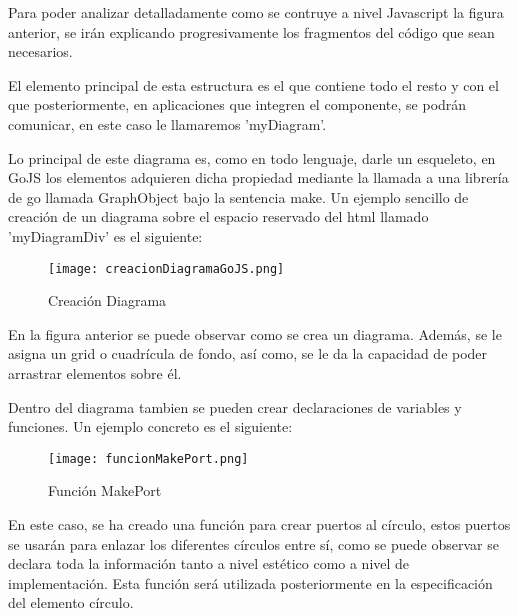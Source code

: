 \vspace{5mm}

Para poder analizar detalladamente como se contruye a nivel Javascript la figura anterior, se irán explicando progresivamente los fragmentos del código que sean necesarios.

\vspace{5mm}

El elemento principal de esta estructura es el que contiene todo el resto y con el que posteriormente, en aplicaciones que integren el componente, se podrán comunicar, en este caso le llamaremos 'myDiagram'.

Lo principal de este diagrama es, como en todo lenguaje, darle un esqueleto, en GoJS los elementos adquieren dicha propiedad mediante la llamada a una librería de go llamada GraphObject bajo la sentencia make. Un ejemplo sencillo de creación de un diagrama sobre el espacio reservado del html llamado 'myDiagramDiv' es el siguiente:

\vspace{5mm}

\begin{figure}[H]
	\centering
	\texttt{[image: creacionDiagramaGoJS.png]}
	\caption{Creación Diagrama}\label{fig:creacionDiagramaGoJS}
\end{figure}

\vspace{5mm}

En la figura anterior se puede observar como se crea un diagrama. Además, se le asigna un grid o cuadrícula de fondo, así como, se le da la capacidad de poder arrastrar elementos sobre él.

\vspace{5mm}

Dentro del diagrama tambien se pueden crear declaraciones de variables y funciones. Un ejemplo concreto es el siguiente:

\begin{figure}[H]
	\centering
	\texttt{[image: funcionMakePort.png]}
	\caption{Función MakePort}\label{fig:funcionMakePort}
\end{figure}

En este caso, se ha creado una función para crear puertos al círculo, estos puertos se usarán para enlazar los diferentes círculos entre sí, como se puede observar se declara toda la información tanto a nivel estético como a nivel de implementación. Esta función será utilizada posteriormente en la especificación del elemento círculo.

